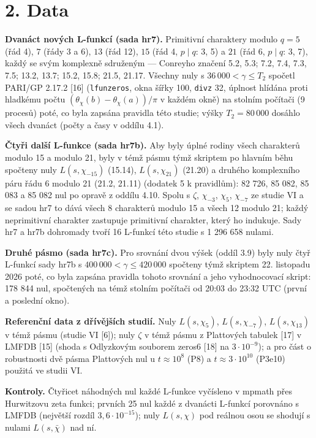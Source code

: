 \documentclass[
  10pt,
]{article}
\begin{document}
\hypertarget{data}{%
\section{2. Data}\label{data}}

\textbf{Dvanáct nových L-funkcí (sada hr7).} Primitivní charaktery
modulo \(q = 5\) (řád 4), \(7\) (řády 3 a 6), \(13\) (řád 12), \(15\)
(řád 4, \(p \mid q\): 3, 5) a \(21\) (řád 6, \(p \mid q\): 3, 7), každý
se svým komplexně sdruženým --- Conreyho značení 5.2, 5.3; 7.2, 7.4,
7.3, 7.5; 13.2, 13.7; 15.2, 15.8; 21.5, 21.17. Všechny nuly s
\(36\,000 < \gamma \le T_2\) spočetl PARI/GP 2.17.2 {[}16{]}
(\texttt{lfunzeros}, okna šířky 100, \texttt{divz} 32, úplnost hlídána
proti hladkému počtu \((\theta_\chi(b) - \theta_\chi(a))/\pi\) v každém
okně) na stolním počítači (9 procesů) poté, co byla zapsána pravidla
této studie; výšky \(T_2 = 80\,000\) dosáhlo všech dvanáct (počty a časy
v oddílu 4.1).

\textbf{Čtyři další L-funkce (sada hr7b).} Aby byly úplné rodiny všech
charakterů modulo 15 a modulo 21, byly v témž pásmu týmž skriptem po
hlavním běhu spočteny nuly \(L(s, \chi_{-15})\) (15.14),
\(L(s, \chi_{21})\) (21.20) a druhého komplexního páru řádu 6 modulo 21
(21.2, 21.11) (dodatek 5 k pravidlům): 82 726, 85 082, 85 083 a 85 082
nul po opravě z oddílu 4.10. Spolu s \(\zeta\), \(\chi_{-3}\),
\(\chi_5\), \(\chi_{-7}\) ze studie VI a se sadou hr7 to dává všech 8
charakterů modulo 15 a všech 12 modulo 21; každý neprimitivní charakter
zastupuje primitivní charakter, který ho indukuje. Sady hr7 a hr7b
dohromady tvoří 16 L-funkcí této studie s 1 296 658 nulami.

\textbf{Druhé pásmo (sada hr7c).} Pro srovnání dvou výšek (oddíl 3.9)
byly nuly čtyř L-funkcí sady hr7b s \(400\,000 < \gamma \le 420\,000\)
spočteny týmž skriptem 22. listopadu 2026 poté, co byla zapsána pravidla
tohoto srovnání a jeho vyhodnocovací skript: 178 844 nul, spočtených na
témž stolním počítači od 20:03 do 23:32 UTC (první a poslední okno).

\textbf{Referenční data z dřívějších studií.} Nuly \(L(s, \chi_5)\),
\(L(s, \chi_{-7})\), \(L(s, \chi_{13})\) v témž pásmu (studie VI
{[}6{]}); nuly \(\zeta\) v témž pásmu z Plattových tabulek {[}17{]} v
LMFDB {[}15{]} (shoda s Odlyzkovým souborem zeros6 {[}18{]} na
\(3\cdot10^{-9}\)); a pro část o robustnosti dvě pásma Plattových nul u
\(t \approx 10^8\) (P8) a \(t \approx 3\cdot10^{10}\) (P3e10) použitá ve
studii VI.

\textbf{Kontroly.} Čtyřicet náhodných nul každé L-funkce vyčísleno v
mpmath přes Hurwitzovu zeta funkci; prvních 25 nul každé z dvanácti
L-funkcí porovnáno s LMFDB (největší rozdíl \(3{,}6\cdot10^{-15}\));
nuly \(L(s, \chi)\) pod reálnou osou se shodují s nulami
\(L(s, \bar\chi)\) nad ní.
\end{document}
